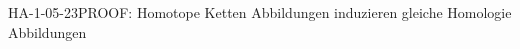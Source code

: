 
\begin{REM}{HA-1-05-23}{PROOF: Homotope Ketten Abbildungen induzieren gleiche Homologie Abbildungen}
\end{REM}
